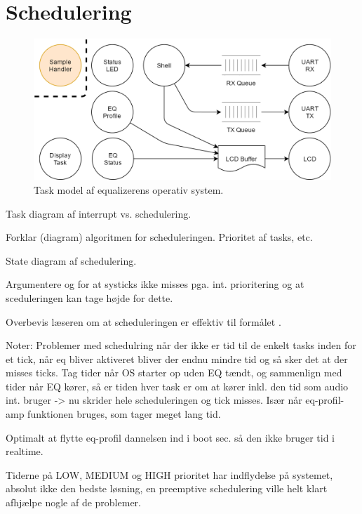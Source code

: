 \section{Schedulering}

\begin{figure}[h!]
	\centering
	\includegraphics[width=.8\textwidth]{billeder/eq-one.png}
	\caption{Task model af equalizerens operativ system.}
	\label{fig:eq-taskmodel}
\end{figure}

Task diagram af interrupt vs. schedulering.

Forklar (diagram) algoritmen for scheduleringen. Prioritet af tasks, etc.

State diagram af schedulering.

Argumentere og for at systicks ikke misses pga. int. prioritering og at sceduleringen kan tage højde for dette.

Overbevis læseren om at scheduleringen er effektiv til formålet .

Noter:
Problemer med schedulring når der ikke er tid til de enkelt tasks inden for et tick, når eq bliver aktiveret bliver der endnu mindre tid og så sker det at der misses ticks.
Tag tider når OS starter op uden EQ tændt, og sammenlign med tider når EQ kører, så er tiden hver task er om at kører inkl. den tid som audio int. bruger -> nu skrider hele scheduleringen og tick misses. Især når eq-profil-amp funktionen bruges, som tager meget lang tid.

Optimalt at flytte eq-profil dannelsen ind i boot sec. så den ikke bruger tid i realtime.

Tiderne på LOW, MEDIUM og HIGH prioritet har indflydelse på systemet, absolut ikke den bedste løsning, en preemptive schedulering ville helt klart afhjælpe nogle af de problemer.




 

